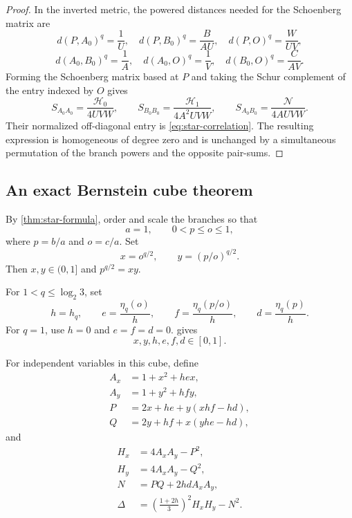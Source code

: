 \documentclass[11pt]{amsart}
\theoremstyle{definition}
\theoremstyle{remark}
\begin{document}
\begin{proof}
In the inverted metric, the powered distances needed for the Schoenberg
matrix are
\[
 d(P,A_0)^q=\frac1U,
 \quad d(P,B_0)^q=\frac{B}{AU},
 \quad d(P,O)^q=\frac{W}{UV},
\]
\[
 d(A_0,B_0)^q=\frac1A,
 \quad d(A_0,O)^q=\frac1V,
 \quad d(B_0,O)^q=\frac{C}{AV}.
\]
Forming the Schoenberg matrix based at $P$ and taking the Schur complement
of the entry indexed by $O$ gives
\[
 S_{A_0A_0}=\frac{\mathcal H_0}{4UVW},
 \qquad
 S_{B_0B_0}=\frac{\mathcal H_1}{4A^2UVW},
 \qquad
 S_{A_0B_0}=\frac{\mathcal N}{4AUVW}.
\]
Their normalized off-diagonal entry is \eqref{eq:star-correlation}.
The resulting expression is homogeneous of degree zero and is unchanged
by a simultaneous permutation of the branch powers and the opposite
pair-sums.
\end{proof}

\subsection{An exact Bernstein cube theorem}

By \cref{thm:star-formula}, order and scale the branches so that
\[
 a=1,
 \qquad
 0<p\leq o\leq1,
\]
where \(p=b/a\) and \(o=c/a\). Set
\begin{equation}\label{eq:xy-chart}
 x=o^{q/2},
 \qquad
 y=(p/o)^{q/2}.
\end{equation}
Then \(x,y\in(0,1]\) and \(p^{q/2}=xy\).

For \(1<q\leq\log_2 3\), set
\begin{equation}\label{eq:defect-coordinates}
 h=h_q,
 \qquad
 e=\frac{\eta_q(o)}h,
 \qquad
 f=\frac{\eta_q(p/o)}h,
 \qquad
 d=\frac{\eta_q(p)}h.
\end{equation}
For \(q=1\), use \(h=0\) and \(e=f=d=0\).  gives
\[
 x,y,h,e,f,d\in[0,1].
\]

For independent variables in this cube, define
\begin{align}
 A_x&=1+x^2+hex,\label{eq:Ax}\\
 A_y&=1+y^2+hfy,\label{eq:Ay}\\
 P&=2x+he+y(xhf-hd),\label{eq:P}\\
 Q&=2y+hf+x(yhe-hd),\label{eq:Q}
\end{align}
and
\begin{align}
 H_x&=4A_xA_y-P^2,\label{eq:Hx}\\
 H_y&=4A_xA_y-Q^2,\label{eq:Hy}\\
 N&=PQ+2hdA_xA_y,\label{eq:N}\\
 \Delta&=\left(\frac{1+2h}{3}\right)^2H_xH_y-N^2.\label{eq:Delta}
\end{align}
\end{document}
